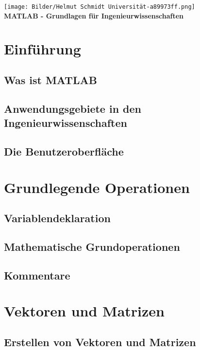 \documentclass[12pt, a4paper, twoside]{article}
\begin{document}
    \thispagestyle{empty}
    \begin{center}
        \texttt{[image: Bilder/Helmut Schmidt Universität-a89973ff.png]}\\
        \vspace{2cm}
        \huge\textbf{MATLAB - Grundlagen für Ingenieurwissenschaften}
    \end{center}
    \newpage

    \renewcommand{\contentsname}{Inhaltsverzeichnis}
    \tableofcontents
    \newpage
    \section{Einführung}
        \subsection{Was ist MATLAB}
        \subsection{Anwendungsgebiete in den Ingenieurwissenschaften}
        \subsection{Die Benutzeroberfläche}
    \section{Grundlegende Operationen}
        \subsection{Variablendeklaration}
        \subsection{Mathematische Grundoperationen}
        \subsection{Kommentare}
    \section{Vektoren und Matrizen}
        \subsection{Erstellen von Vektoren und Matrizen}
\end{document}

